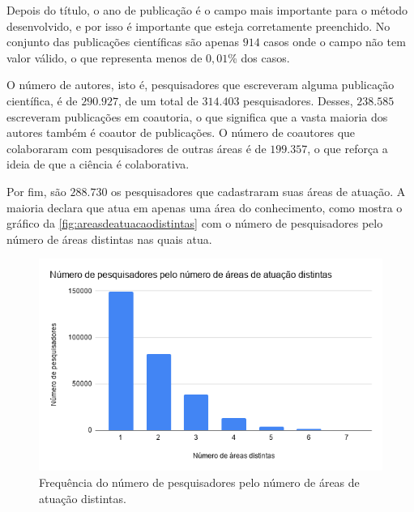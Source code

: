 Depois do título, o ano de publicação é o campo mais importante para o método desenvolvido, e por isso é importante que esteja corretamente preenchido. No conjunto das publicações científicas são apenas $914$ casos onde o campo não tem valor válido, o que representa menos de $0,01$\% dos casos.

O número de autores, isto é, pesquisadores que escreveram alguma publicação científica, é de $290.927$, de um total de $314.403$ pesquisadores. Desses, $238.585$ escreveram publicações em coautoria, o que significa que a vasta maioria dos autores também é coautor de publicações. O número de coautores que colaboraram com pesquisadores de outras áreas é de $199.357$, o que reforça a ideia de que a ciência é colaborativa.

Por fim, são $288.730$ os pesquisadores que cadastraram suas áreas de atuação. A maioria declara que atua em apenas uma área do conhecimento, como mostra o gráfico da \autoref{fig:areasdeatuacaodistintas} com o número de pesquisadores pelo número de áreas distintas nas quais atua.

\begin{figure}[htpb]
  \centering
  \includegraphics[width=.8\textwidth]{figuras/conjuntodedados-numero-de-areas-distintas}
  \caption{Frequência do número de pesquisadores pelo número de áreas de atuação distintas.}
  \label{fig:areasdeatuacaodistintas}
\end{figure}
